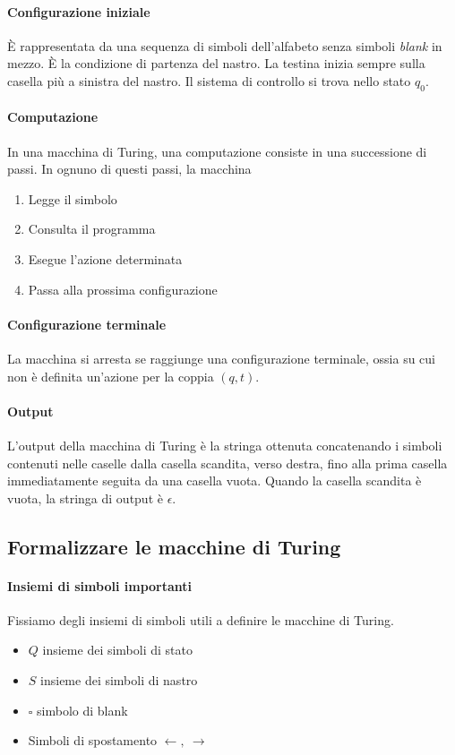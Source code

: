 \paragraph{Configurazione iniziale} È rappresentata da una sequenza di simboli dell'alfabeto senza simboli \textit{blank} in mezzo. È la condizione di partenza del nastro. La testina inizia sempre sulla casella più a sinistra del nastro. Il sistema di controllo si trova nello stato $q_0$.

\paragraph{Computazione} In una macchina di Turing, una computazione consiste in una successione di passi. In ognuno di questi passi, la macchina

\begin{enumerate}
	\item Legge il simbolo 
	\item Consulta il programma
	\item Esegue l'azione determinata
	\item Passa alla prossima configurazione
\end{enumerate}

\paragraph{Configurazione terminale} La macchina si arresta se raggiunge una configurazione terminale, ossia su cui non è definita un'azione per la coppia $(q,t)$.

\paragraph{Output}
L'output della macchina di Turing è la stringa ottenuta concatenando i simboli contenuti nelle caselle dalla casella scandita, verso destra, fino alla prima casella immediatamente seguita da una casella vuota. Quando la casella scandita è vuota, la stringa di output è $\epsilon$.


\subsection{Formalizzare le macchine di Turing}

\paragraph{Insiemi di simboli importanti}
Fissiamo degli insiemi di simboli utili a definire le macchine di Turing.
\begin{itemize}
	\item $Q$ insieme dei simboli di stato
	\item $S$ insieme dei simboli di nastro
	\item $\square$ simbolo di blank
	\item Simboli di spostamento $\leftarrow, \ \rightarrow$
\end{itemize}


